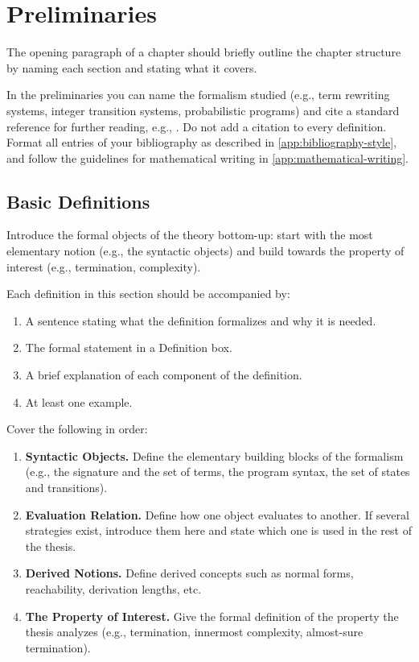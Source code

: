 \chapter{Preliminaries}\label{chap:preliminaries}

The opening paragraph of a chapter should briefly outline the chapter structure 
by naming each section and stating what it covers.

In the preliminaries you can name the formalism studied (e.g., term rewriting 
systems, integer transition systems, probabilistic programs) and cite a 
standard reference for further reading, e.g., \cite{baader_nipkow_1999}.
Do not add a citation to every definition.
Format all entries of your bibliography as described in
\cref{app:bibliography-style}, and follow the guidelines for mathematical
writing in \cref{app:mathematical-writing}.
\section{Basic Definitions}\label{sec:basic-definitions}

Introduce the formal objects of the theory bottom-up: start with the most
elementary notion (e.g., the syntactic objects) and build towards the
property of interest (e.g., termination, complexity).

Each definition in this section should be accompanied by:
\begin{enumerate}
    \item A sentence stating what the definition formalizes and why it is needed.
    \item The formal statement in a Definition box.
    \item A brief explanation of each component of the definition.
    \item At least one example.
\end{enumerate}

Cover the following in order:
\begin{enumerate}
    \item \textbf{Syntactic Objects.} Define the elementary building blocks
          of the formalism (e.g., the signature and the set of terms, the
          program syntax, the set of states and transitions).
    \item \textbf{Evaluation Relation.} Define how one object
          evaluates to another. If several strategies exist, introduce them
          here and state which one is used in the rest of the thesis.
    \item \textbf{Derived Notions.} Define derived concepts such as normal
          forms, reachability, derivation lengths, etc.
    \item \textbf{The Property of Interest.} Give the formal definition of
          the property the thesis analyzes (e.g., termination, innermost
          complexity, almost-sure termination).
\end{enumerate}

